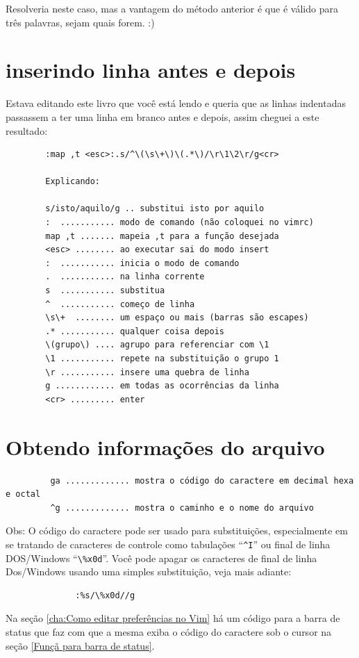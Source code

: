 \documentclass[10pt,a4paper,openany]{book}
\begin{document}
Resolveria neste caso, mas a vantagem do método anterior é que
é válido para três palavras, sejam quais forem. :)

\section{inserindo linha antes e depois}
Estava editando este livro que você está lendo
e queria que as linhas indentadas passassem a ter
uma linha em branco antes e depois, assim cheguei
a este resultado:
\begin{verbatim}
		:map ,t <esc>:.s/^\(\s\+\)\(.*\)/\r\1\2\r/g<cr>

		Explicando:

		s/isto/aquilo/g .. substitui isto por aquilo
		:  ........... modo de comando (não coloquei no vimrc)
		map ,t ....... mapeia ,t para a função desejada
		<esc> ........ ao executar sai do modo insert
		:  ........... inicia o modo de comando
		.  ........... na linha corrente
		s  ........... substitua
		^  ........... começo de linha
		\s\+  ........ um espaço ou mais (barras são escapes)
		.* ........... qualquer coisa depois
		\(grupo\) .... agrupo para referenciar com \1
		\1 ........... repete na substituição o grupo 1
		\r ........... insere uma quebra de linha
		g ............ em todas as ocorrências da linha
		<cr> ......... enter
\end{verbatim}


\section{Obtendo informações do arquivo }

\begin{verbatim}
		 ga ............. mostra o código do caractere em decimal hexa e octal
		 ^g ............. mostra o caminho e o nome do arquivo
\end{verbatim}

Obs: O código do caractere pode ser usado para substituições,
especialmente em se tratando de caracteres de controle como tabulações
``\verb|^I|'' ou final de linha DOS/Windows ``\verb|\%x0d|''. Você pode apagar os
caracteres de final de linha Dos/Windows usando uma simples
substituição, veja mais adiante:

\begin{verbatim}
			  :%s/\%x0d//g
\end{verbatim}

Na seção \ref{cha:Como editar preferências no Vim} há um código para a barra de
status que faz com que a mesma exiba o código do caractere sob o cursor na
seção \ref{Funçã para barra de status}.
\end{document}
